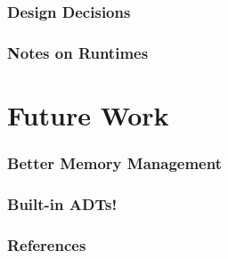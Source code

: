 \documentclass{beamer}
\begin{document}
\begin{frame}
\frametitle{Design Decisions}
\end{frame}

\begin{frame}
\frametitle{Notes on Runtimes}
\end{frame}

\section{Future Work}

\begin{frame}
\frametitle{Better Memory Management}
\end{frame}

\begin{frame}
\frametitle{Built-in ADTs!}
\end{frame}


\begin{frame}
\frametitle{References}
\end{frame}
\end{document}
